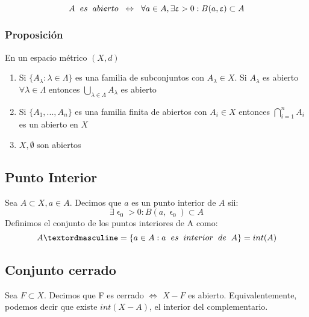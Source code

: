 \documentclass[11pt]{article}
\begin{document}
\[
A \hspace{0.2cm} es \hspace{0.2cm}abierto \hspace{0.2cm}\Leftrightarrow \hspace{0.2cm} \forall a \in A, \exists \upvarepsilon > 0 : B(a,\upvarepsilon)\subset A
\]



\subsubsection*{Proposición}

En un espacio métrico $(X,d)$
\begin{enumerate}
	\item Si $\{ A_\lambda : \lambda \in \Lambda\}$ es una familia de subconjuntos con $A_\lambda \in X$. Si $A_\lambda$ es abierto $\forall \lambda \in \Lambda$ entonces $\bigcup_{\lambda \in \Lambda}A_\lambda$ es abierto

	\item Si $\{A_1,...,A_n\}$ es una familia finita de abiertos con $A_i \in X $ entonces $\bigcap_{i=1}^n A_i$ es un abierto en $X$

	\item $X, \emptyset$ son abiertos

\end{enumerate}

\subsection*{Punto Interior}

Sea $A\subset X, a \in A$. Decimos que $a$ es un punto interior de $A$ sii:
\[
\exists \upvarepsilon_0 > 0: B(a,\upvarepsilon_0) \subset A
\]
Definimos el conjunto de los puntos interiores de A como:
\[
Aº = \{ a\in A: a \hspace{0.2cm} es \hspace{0.2cm} interior\hspace{0.2cm}de \hspace{0.2cm}A \} = int(A)
\]



\subsection*{Conjunto cerrado}

Sea $F\subset X$. Decimos que F es cerrado $\Leftrightarrow$ $X-F$ es abierto.
Equivalentemente, podemos decir que existe $int(X-A)$, el interior del complementario.
\end{document}
